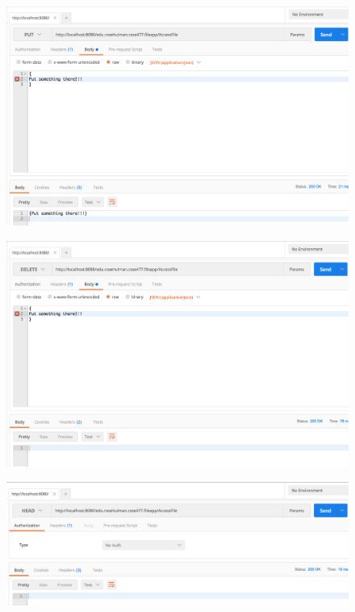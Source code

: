 \documentclass[12pt,letterpaper,boxed]{hmcpset}
\begin{document}
\begin{figure}[H]
  \centering
  \includegraphics[width = 1.0\textwidth]{put.png}
\end{figure}
\begin{figure}[H]
  \centering
  \includegraphics[width = 1.0\textwidth]{delete.png}
\end{figure}
\begin{figure}[H]
  \centering
  \includegraphics[width = 1.0\textwidth]{head.png}
\end{figure}
\end{document}
